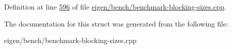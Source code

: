 Definition at line \hyperlink{eigen_2bench_2benchmark-blocking-sizes_8cpp_source_l00596}{596} of file \hyperlink{eigen_2bench_2benchmark-blocking-sizes_8cpp_source}{eigen/bench/benchmark-\/blocking-\/sizes.\+cpp}.



The documentation for this struct was generated from the following file\+:\begin{DoxyCompactItemize}
\item 
eigen/bench/benchmark-\/blocking-\/sizes.\+cpp\end{DoxyCompactItemize}
